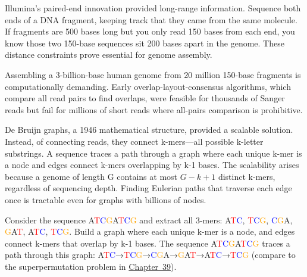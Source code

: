 Illumina's paired-end innovation provided long-range information. Sequence both ends of a DNA fragment, keeping track that they came from the same molecule. If fragments are 500 bases long but you only read 150 bases from each end, you know those two 150-base sequences sit 200 bases apart in the genome. These distance constraints prove essential for genome assembly.

Assembling a 3-billion-base human genome from 20 million 150-base fragments is computationally demanding. Early overlap-layout-consensus algorithms, which compare all read pairs to find overlaps, were feasible for thousands of Sanger reads but fail for millions of short reads where all-pairs comparison is prohibitive.

De Bruijn graphs, a 1946 mathematical structure, provided a scalable solution. Instead, of connecting reads, they connect k-mers—all possible k-letter substrings. A sequence traces a path through a graph where each unique k-mer is a node and edges connect k-mers overlapping by k-1 bases. The scalability arises because a genome of length G contains at most $G-k+1$ distinct k-mers, regardless of sequencing depth. Finding Eulerian paths that traverse each edge once is tractable even for graphs with billions of nodes.

Consider the sequence \textcolor{green!60!black}{A}\textcolor{red}{T}\textcolor{blue}{C}\textcolor{orange}{G}\textcolor{green!60!black}{A}\textcolor{red}{T}\textcolor{blue}{C}\textcolor{orange}{G} and extract all 3-mers: \textcolor{green!60!black}{A}\textcolor{red}{T}\textcolor{blue}{C}, \textcolor{red}{T}\textcolor{blue}{C}\textcolor{orange}{G}, \textcolor{blue}{C}\textcolor{orange}{G}\textcolor{green!60!black}{A}, \textcolor{orange}{G}\textcolor{green!60!black}{A}\textcolor{red}{T}, \textcolor{green!60!black}{A}\textcolor{red}{T}\textcolor{blue}{C}, \textcolor{red}{T}\textcolor{blue}{C}\textcolor{orange}{G}. Build a graph where each unique k-mer is a node, and edges connect k-mers that overlap by k-1 bases. The sequence \textcolor{green!60!black}{A}\textcolor{red}{T}\textcolor{blue}{C}\textcolor{orange}{G}\textcolor{green!60!black}{A}\textcolor{red}{T}\textcolor{blue}{C}\textcolor{orange}{G} traces a path through this graph: \textcolor{green!60!black}{A}\textcolor{red}{T}\textcolor{blue}{C}→\textcolor{red}{T}\textcolor{blue}{C}\textcolor{orange}{G}→\textcolor{blue}{C}\textcolor{orange}{G}\textcolor{green!60!black}{A}→\textcolor{orange}{G}\textcolor{green!60!black}{A}\textcolor{red}{T}→\textcolor{green!60!black}{A}\textcolor{red}{T}\textcolor{blue}{C}→\textcolor{red}{T}\textcolor{blue}{C}\textcolor{orange}{G} (compare to the superpermutation problem in \hyperref[ch:superpermutationsbreakthrough]{Chapter~39}).

